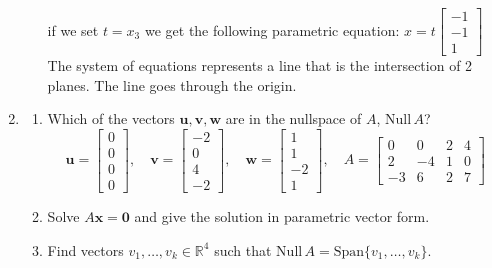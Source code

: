 \documentclass[12pt,a4paper]{exam}
\newcommand{\bo}{\mathbf{0}}
\newcommand{\bu}{\mathbf{u}}
\newcommand{\bv}{\mathbf{v}}
\newcommand{\bw}{\mathbf{w}}
\newcommand{\bx}{\mathbf{x}}
\newcommand{\R}{\mathbb{R}}
\newcommand{\Nul}{\mathrm{Null\,}}
\newcommand{\Span}{\mathrm{Span}}
\begin{document}
\begin{enumerate}
\begin{solution}
\begin{enumerate}
      if we set $t=x_3$ we get the following parametric equation: 
      $x=t\left[\begin{array}{c} -1 \\ -1 \\ 1 \end{array}\right]$\\
      The system of equations represents a line that is the intersection of 2 planes. The line goes through the origin.

  \end{enumerate}
\end{solution}



\item\label{mat12}
\begin{enumerate}
\item Which of the vectors $\bu,\bv,\bw$ are in the nullspace of $A$, $\Nul A$?
\[ 
\bu = \left[\begin{matrix} 0 \\ 0 \\ 0 \\ 0 \end{matrix}\right], \quad
\bv = \left[\begin{matrix} -2 \\ 0 \\ 4 \\ -2 \end{matrix}\right], \quad
\bw = \left[\begin{matrix} 1 \\ 1 \\ -2 \\ 1 \end{matrix}\right], \quad
A = \left[ \begin{matrix}
 0 & 0 & 2 & 4 \\
 2 & -4 & 1 & 0 \\
 -3 & 6 & 2 & 7
 \end{matrix} \right] \]

\item  Solve $A\bx=\bo$ and give the solution in parametric vector form.

\item  Find vectors $v_1,\dots,v_k \in \R^4$ such that $\Nul A = \Span\{ v_1,\dots,v_k \}$.
\end{enumerate}



\end{enumerate}
\end{document}
